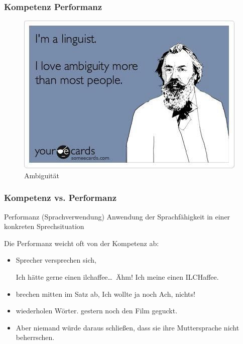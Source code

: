 \begin{frame}
\frametitle{Kompetenz \vs Performanz}

\begin{figure}
\centering
	\includegraphics[scale=.5]{material/08ambiguity}
	\caption{Ambiguität}
\end{figure}

\end{frame}


\begin{frame}
\frametitle{Kompetenz vs. Performanz}

\begin{block}{Performanz (Sprachverwendung)}
Anwendung der Sprachfähigkeit in einer konkreten Sprechsituation \citep[vgl.][]{Fries&MyP16d}	
\end{block}

\end{frame}


\begin{frame}

Die Performanz weicht oft von der Kompetenz ab: 
	\begin{itemize}
		\item Sprecher versprechen sich, 
		
\pause		
		\ea Ich hätte gerne einen ilchaffee\dots\ Ähm! Ich meine einen ILCHaffee.
		\z

\pause	
		\item brechen mitten im Satz ab,
\pause		
		\ea Ich wollte ja noch \alertred{\dots } Ach, nichts!
		\z

		\item wiederholen Wörter.
\pause		
		\ea {} gestern noch den Film geguckt.
		\z

		\item[]	Aber niemand würde daraus schließen, dass sie ihre Muttersprache nicht beherrschen.
	\end{itemize}

\end{frame}


